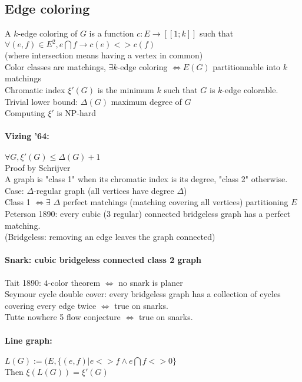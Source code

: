 \documentclass[12pt]{article}
\begin{document}
\subsection{Edge coloring}
A $k$-edge coloring of $G$ is a function $c : E \rightarrow [[1;k]]$ such that $\forall (e,f) \in E^2, e \bigcap f \rightarrow c(e) <> c(f)$\\
(where intersection means having a vertex in common)\\
Color classes are matchings, $\exists k$-edge coloring $\Leftrightarrow E(G)$ partitionnable into $k$ matchings\\
Chromatic index $\xi'(G)$ is the minimum $k$ such that $G$ is $k$-edge colorable.\\
Trivial lower bound: $\Delta(G)$ maximum degree of $G$\\
Computing $\xi'$ is NP-hard\\

\paragraph{Vizing '64:} $\forall G, \xi'(G) \leqslant \Delta(G) + 1$\\
Proof by Schrijver\\
A graph is "class 1" when its chromatic index is its degree, "class 2" otherwise.\\
Case: $\Delta$-regular graph (all vertices have degree $\Delta$)\\
Class 1 $\Leftrightarrow \exists$ $\Delta$ perfect matchings (matching covering all vertices) partitioning $E$\\
Peterson 1890: every cubic (3 regular) connected bridgeless graph has a perfect matching.\\
(Bridgeless: removing an edge leaves the graph connected)

\paragraph{Snark: cubic bridgeless connected class 2 graph\\}
Tait 1890: $4$-color theorem $\Leftrightarrow$ no snark is planer\\
Seymour cycle double cover: every bridgeless graph has a collection of cycles covering every edge twice $\Leftrightarrow$ true on snarks.\\
Tutte nowhere 5 flow conjecture $\Leftrightarrow$ true on snarks.\\

\paragraph{Line graph:} $L(G) := (E,\{(e,f) | e <> f \wedge e \bigcap f <> 0 \}$\\
Then $\xi(L(G)) = \xi'(G)$\\
\end{document}
